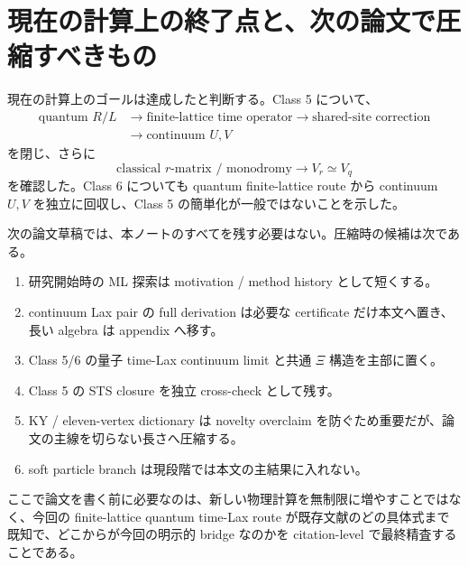 \section{現在の計算上の終了点と、次の論文で圧縮すべきもの}
現在の計算上のゴールは達成したと判断する。Class 5 について、
\begin{equation}
\begin{aligned}
\text{quantum }R/L
&\longrightarrow \text{finite-lattice time operator}
\longrightarrow \text{shared-site correction}\\
&\longrightarrow \text{continuum }U,V
\end{aligned}
\label{eq:endchain1}
\end{equation}
を閉じ、さらに
\begin{equation}
\text{classical }r\text{-matrix / monodromy}
\longrightarrow V_r
\simeq V_q
\label{eq:endchain2}
\end{equation}
を確認した。Class 6 についても quantum finite-lattice route から continuum $U,V$ を独立に回収し、Class 5 の簡単化が一般ではないことを示した。

次の論文草稿では、本ノートのすべてを残す必要はない。圧縮時の候補は次である。
\begin{enumerate}[leftmargin=2.5em]
\item 研究開始時の ML 探索は motivation / method history として短くする。
\item continuum Lax pair の full derivation は必要な certificate だけ本文へ置き、長い algebra は appendix へ移す。
\item Class 5/6 の量子 time-Lax continuum limit と共通 $\Xi$ 構造を主部に置く。
\item Class 5 の STS closure を独立 cross-check として残す。
\item KY / eleven-vertex dictionary は novelty overclaim を防ぐため重要だが、論文の主線を切らない長さへ圧縮する。
\item soft particle branch は現段階では本文の主結果に入れない。
\end{enumerate}

ここで論文を書く前に必要なのは、新しい物理計算を無制限に増やすことではなく、今回の finite-lattice quantum time-Lax route が既存文献のどの具体式まで既知で、どこからが今回の明示的 bridge なのかを citation-level で最終精査することである。

